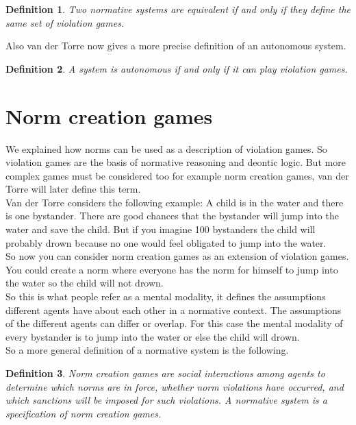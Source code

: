 \documentclass[conference]{hehe}
\newtheorem{definition}{Definition}
\begin{document}
\begin{definition}
Two normative systems are equivalent if and only if they define the same set of violation games.\cite{b2}\\
\end{definition}

Also van der Torre now gives a more precise definition of an autonomous system.

\begin{definition}
A system is autonomous if and only if it can play violation games.\cite{b2}\\
\end{definition}


\section{Norm creation games}
We explained how norms can be used as a description of violation games. So violation games are the basis of normative reasoning and deontic logic. But more complex games must be considered too for example norm creation games, van der Torre will later define this term.\\
Van der Torre considers the following example: A child is in the water and there is one bystander. There are good chances that the bystander will jump into the water and save the child. But if you imagine 100 bystanders the child will probably drown because no one would feel obligated to jump into the water.\\
So now you can consider norm creation games as an extension of violation games. You could create a norm where everyone has the norm for himself to jump into the water so the child will not drown.\\
So this is what people refer as a mental modality, it defines the assumptions different agents have about each other in a normative context. The assumptions of the different agents can differ or overlap. For this case the mental modality of every bystander is to jump into the water or else the child will drown.\\
So a more general definition of a normative system is the following.\\

\begin{definition}
Norm creation games are social
interactions among agents to determine which norms are in force, whether norm violations have occurred, and which sanctions will be imposed for such violations. A
normative system is a specification of norm creation games.\cite{b2}\\
\end{definition}
\end{document}

